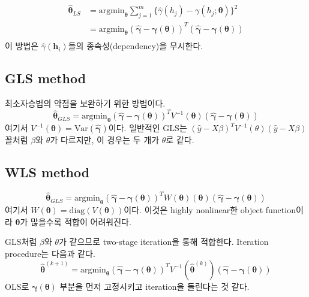 \documentclass[b5paper,]{scrbook}
\theoremstyle{plain}
\theoremstyle{definition}
\numberwithin{equation}{section}
\begin{document}
\[
\begin{aligned}
\hat{\boldsymbol{\theta}}_{LS}&=\text{argmin}_{\boldsymbol{\theta}}\sum_{j=1}^{m}\{ \hat{\gamma}(h_{j})-\gamma(h_{j};\boldsymbol{\theta})\}^{2}\\
&=\text{argmin}_{\boldsymbol{\theta}}(\hat{\boldsymbol{\gamma}}-\boldsymbol{\gamma}(\boldsymbol{\theta}))^{T}(\hat{\boldsymbol{\gamma}}-\boldsymbol{\gamma}(\boldsymbol{\theta}))\\
\end{aligned}
\] 이 방법은 \(\hat{\gamma}(\mathbf{h}_{i})\)들의 종속성(dependency)을
무시한다.

\subsection{GLS method}\label{gls-method}

최소자승법의 약점을 보완하기 위한 방법이다.
\[\hat{\boldsymbol{\theta}}_{GLS}=\text{argmin}_{\boldsymbol{\theta}}(\hat{\boldsymbol{\gamma}}-\boldsymbol{\gamma}(\boldsymbol{\theta}))^{T}V^{-1}(\boldsymbol{\theta})(\hat{\boldsymbol{\gamma}}-\boldsymbol{\gamma}(\boldsymbol{\theta}))\]
여기서
\(V^{-1}(\boldsymbol{\theta})=\text{Var}(\hat{\boldsymbol{\gamma}})\)이다.
일반적인 GLS는
\((\hat{y}-X\beta)^{T}V^{-1}(\theta)(\hat{y}-X\beta)\)꼴처럼 \(\beta\)와
\(\theta\)가 다르지만, 이 경우는 두 개가 \(\theta\)로 같다.

\subsection{WLS method}\label{wls-method}

\[\hat{\boldsymbol{\theta}}_{GLS}=\text{argmin}_{\boldsymbol{\theta}}(\hat{\boldsymbol{\gamma}}-\boldsymbol{\gamma}(\boldsymbol{\theta}))^{T}W(\boldsymbol{\theta})(\boldsymbol{\theta})(\hat{\boldsymbol{\gamma}}-\boldsymbol{\gamma}(\boldsymbol{\theta}))\]
여기서
\(W(\boldsymbol{\theta})=\text{diag}(V(\boldsymbol{\theta}))\)이다.
이것은 highly nonlinear한 object function이라 \(\boldsymbol{\theta}\)가
많을수록 적합이 어려워진다.

GLS처럼 \(\beta\)와 \(\theta\)가 같으므로 two-stage iteration을 통해
적합한다. Iteration procedure는 다음과 같다.
\[\hat{\boldsymbol{\theta}}^{(k+1)}=\text{argmin}_{\boldsymbol{\theta}}(\hat{\boldsymbol{\gamma}}-\boldsymbol{\gamma}(\boldsymbol{\theta}))^{T}V^{-1}(\hat{\boldsymbol{\theta}}^{(k)})(\hat{\boldsymbol{\gamma}}-\boldsymbol{\gamma}(\boldsymbol{\theta}))\]
OLS로 \(\boldsymbol{\gamma}(\boldsymbol{\theta})\) 부분을 먼저
고정시키고 iteration을 돌린다는 것 같다.
\end{document}
